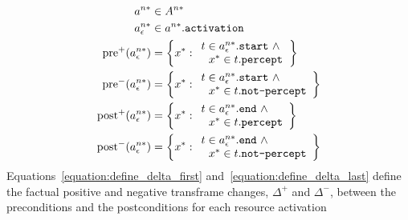 \begin{align}
\label{equation:define_precondition_postcondition_first}
                                   a^{n*} &\in A^{n*} \\
                           a^{n*}_\epsilon &\in a^{n*}.\text{\tt{activation}} \\
   \text{pre}^{+}(a^{n*}_\epsilon) &= \left\{x^* : \begin{array}{l}
                                                   t \in a^{n*}_\epsilon.\text{\tt{start}} ~\wedge~ \\
                                                   ~~x^* \in t.\text{\tt{percept}}
                                                 \end{array}\right\} \\
   \text{pre}^{-}(a^{n*}_\epsilon) &= \left\{x^* : \begin{array}{l}
                                                   t \in a^{n*}_\epsilon.\text{\tt{start}} ~\wedge~ \\
                                                   ~~x^* \in t.\text{\tt{not-percept}}
                                                 \end{array}\right\} \\
  \text{post}^{+}(a^{n*}_\epsilon) &= \left\{x^* : \begin{array}{l}
                                                   t \in a^{n*}_\epsilon.\text{\tt{end}} ~\wedge~ \\
                                                   ~~x^* \in t.\text{\tt{percept}}
                                                 \end{array}\right\} \\
\label{equation:define_precondition_postcondition_last}
  \text{post}^{-}(a^{n*}_\epsilon) &= \left\{x^* : \begin{array}{l}
                                                   t \in a^{n*}_\epsilon.\text{\tt{end}} ~\wedge~ \\
                                                   ~~x^* \in t.\text{\tt{not-percept}}
                                                 \end{array}\right\} \\
\end{align}
Equations\ \ref{equation:define_delta_first}
and\ \ref{equation:define_delta_last} define the factual positive and
negative transframe changes, $\Delta^{+}$ and $\Delta^{-}$, between
the preconditions and the postconditions for each resource activation
